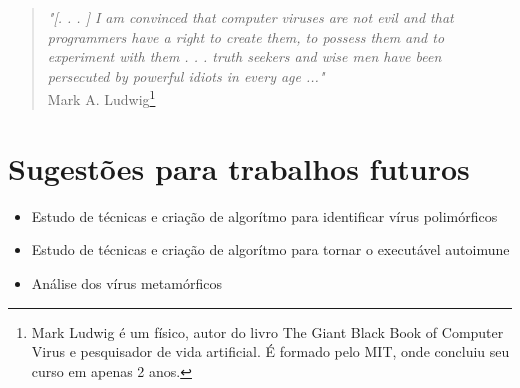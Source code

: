\begin{quotation}
\noindent
\emph{"[. . . ] I am convinced that computer viruses are not evil and that\\
programmers have a right to create them, to possess them and to\\
experiment with them . . . truth seekers and wise men have been\\
persecuted by powerful idiots in every age ..."}\\
Mark A. Ludwig\footnote{Mark Ludwig é um físico, autor do livro The Giant Black Book of Computer Virus e pesquisador de vida artificial. É formado pelo MIT, onde concluiu seu curso em apenas 2 anos.}
\end{quotation}


\section{Sugestões para trabalhos futuros}
\begin{itemize}
\item Estudo de técnicas e criação de algorítmo para identificar vírus polimórficos
\item Estudo de técnicas e criação de algorítmo para tornar o executável autoimune
\item Análise dos vírus metamórficos
\end{itemize}
